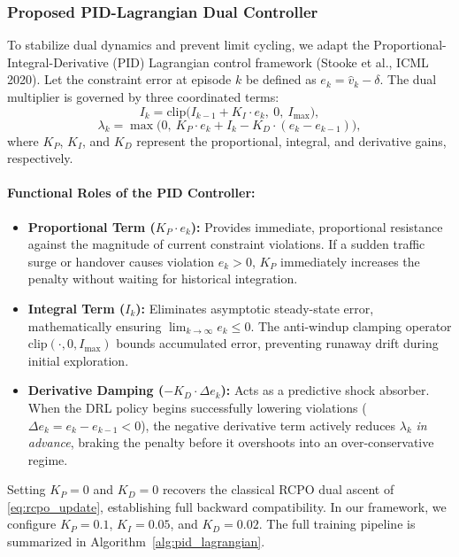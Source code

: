 \documentclass[12pt,a4paper]{article}
\begin{document}
\subsubsection{Proposed PID-Lagrangian Dual Controller}
To stabilize dual dynamics and prevent limit cycling, we adapt the Proportional-Integral-Derivative (PID) Lagrangian control framework (Stooke et al., ICML 2020). Let the constraint error at episode $k$ be defined as $e_k = \hat{v}_k - \delta$. The dual multiplier is governed by three coordinated terms:
\begin{equation}
I_k = \mathrm{clip}\Big( I_{k-1} + K_I \cdot e_k,\ 0,\ I_{\max} \Big),
\label{eq:pid_integral}
\end{equation}
\begin{equation}
\lambda_k = \max\Big( 0,\ K_P \cdot e_k + I_k - K_D \cdot (e_k - e_{k-1}) \Big),
\label{eq:pid_lambda}
\end{equation}
where $K_P$, $K_I$, and $K_D$ represent the proportional, integral, and derivative gains, respectively.

\paragraph{Functional Roles of the PID Controller:}
\begin{itemize}
    \item \textbf{Proportional Term ($K_P \cdot e_k$):} Provides immediate, proportional resistance against the magnitude of current constraint violations. If a sudden traffic surge or handover causes violation $e_k > 0$, $K_P$ immediately increases the penalty without waiting for historical integration.
    \item \textbf{Integral Term ($I_k$):} Eliminates asymptotic steady-state error, mathematically ensuring $\lim_{k \to \infty} e_k \le 0$. The anti-windup clamping operator $\mathrm{clip}(\cdot, 0, I_{\max})$ bounds accumulated error, preventing runaway drift during initial exploration.
    \item \textbf{Derivative Damping ($-K_D \cdot \Delta e_k$):} Acts as a predictive shock absorber. When the DRL policy begins successfully lowering violations ($\Delta e_k = e_k - e_{k-1} < 0$), the negative derivative term actively reduces $\lambda_k$ \emph{in advance}, braking the penalty before it overshoots into an over-conservative regime.
\end{itemize}

Setting $K_P = 0$ and $K_D = 0$ recovers the classical RCPO dual ascent of \eqref{eq:rcpo_update}, establishing full backward compatibility. In our framework, we configure $K_P = 0.1$, $K_I = 0.05$, and $K_D = 0.02$. The full training pipeline is summarized in Algorithm~\ref{alg:pid_lagrangian}.
\end{document}
